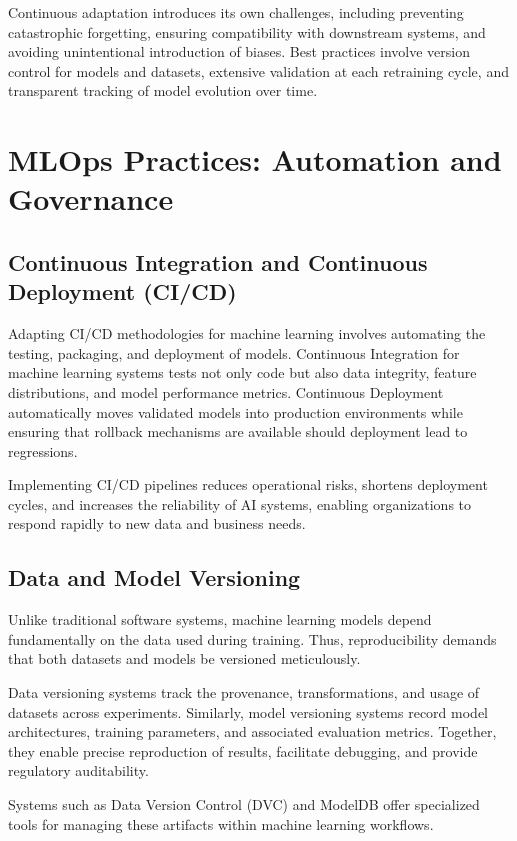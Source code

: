 \documentclass[openany]{book}
\begin{document}
Continuous adaptation introduces its own challenges, including preventing 
catastrophic forgetting, ensuring compatibility with downstream systems, and 
avoiding unintentional introduction of biases. Best practices involve version 
control for models and datasets, extensive validation at each retraining cycle, 
and transparent tracking of model evolution over time.

\section{MLOps Practices: Automation and Governance}

\subsection{Continuous Integration and Continuous Deployment (CI/CD)}
Adapting CI/CD methodologies for machine learning involves automating the 
testing, packaging, and deployment of models. Continuous Integration for machine 
learning systems tests not only code but also data integrity, feature 
distributions, and model performance metrics. Continuous Deployment 
automatically moves validated models into production environments while ensuring 
that rollback mechanisms are available should deployment lead to regressions.

Implementing CI/CD pipelines reduces operational risks, shortens deployment 
cycles, and increases the reliability of AI systems, enabling organizations to 
respond rapidly to new data and business needs.

\subsection{Data and Model Versioning}
Unlike traditional software systems, machine learning models depend 
fundamentally on the data used during training. Thus, reproducibility demands 
that both datasets and models be versioned meticulously.

Data versioning systems track the provenance, transformations, and usage of 
datasets across experiments. Similarly, model versioning systems record model 
architectures, training parameters, and associated evaluation metrics. Together, 
they enable precise reproduction of results, facilitate debugging, and provide 
regulatory auditability.

Systems such as Data Version Control (DVC) and ModelDB offer specialized tools 
for managing these artifacts within machine learning workflows.
\end{document}
